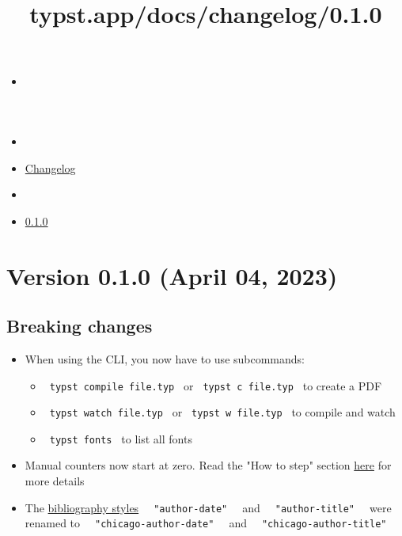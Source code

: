 \title{typst.app/docs/changelog/0.1.0}

\begin{itemize}
\tightlist
\item
  \href{/docs}{}
\item
  
\item
  \href{/docs/changelog/}{Changelog}
\item
  
\item
  \href{/docs/changelog/0.1.0/}{0.1.0}
\end{itemize}

\section{Version 0.1.0 (April 04,
2023)}\label{version-0.1.0-april-04-2023}

\subsection{Breaking changes}\label{breaking-changes}

\begin{itemize}
\tightlist
\item
  When using the CLI, you now have to use subcommands:

  \begin{itemize}
  \tightlist
  \item
    \texttt{\ typst\ compile\ file.typ\ } or
    \texttt{\ typst\ c\ file.typ\ } to create a PDF
  \item
    \texttt{\ typst\ watch\ file.typ\ } or
    \texttt{\ typst\ w\ file.typ\ } to compile and watch
  \item
    \texttt{\ typst\ fonts\ } to list all fonts
  \end{itemize}
\item
  Manual counters now start at zero. Read the "How to step" section
  \href{/docs/reference/introspection/counter/}{here} for more details
\item
  The
  \href{/docs/reference/model/bibliography/\#parameters-style}{bibliography
  styles} \texttt{\ }{\texttt{\ "author-date"\ }}\texttt{\ } and
  \texttt{\ }{\texttt{\ "author-title"\ }}\texttt{\ } were renamed to
  \texttt{\ }{\texttt{\ "chicago-author-date"\ }}\texttt{\ } and
  \texttt{\ }{\texttt{\ "chicago-author-title"\ }}\texttt{\ }
\end{itemize}

